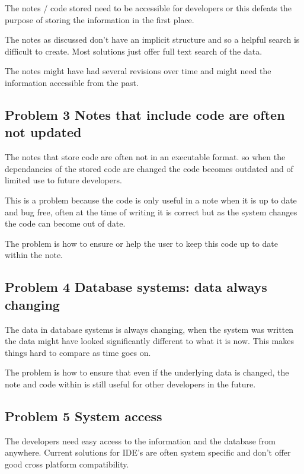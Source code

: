 The notes / code stored need to be accessible for developers or this
defeats the purpose of storing the information in the first place.

The notes as discussed don't have an implicit structure and so a helpful
search is difficult to create. Most solutions just offer full text
search of the data.

The notes might have had several revisions over time and might need the
information accessible from the past.

\subsection{Problem 3 Notes that include code are often not
updated}\label{problem-3-notes-that-include-code-are-often-not-updated}

The notes that store code are often not in an executable format. so when
the dependancies of the stored code are changed the code becomes
outdated and of limited use to future developers.

This is a problem because the code is only useful in a note when it is
up to date and bug free, often at the time of writing it is correct but
as the system changes the code can become out of date.

The problem is how to ensure or help the user to keep this code up to
date within the note.

\subsection{Problem 4 Database systems: data always
changing}\label{problem-4-database-systems-data-always-changing}

The data in database systems is always changing, when the system was
written the data might have looked significantly different to what it is
now. This makes things hard to compare as time goes on.

The problem is how to ensure that even if the underlying data is
changed, the note and code within is still useful for other developers
in the future.

\subsection{Problem 5 System access}\label{problem-5-system-access}

The developers need easy access to the information and the database from
anywhere. Current solutions for IDE's are often system specific and
don't offer good cross platform compatibility.

